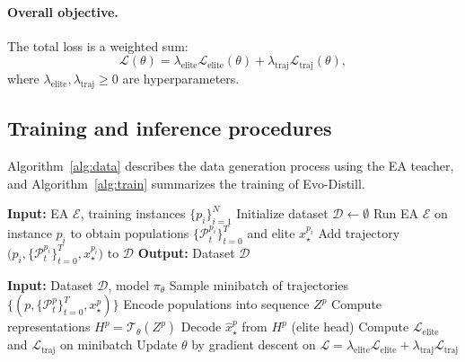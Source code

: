 \documentclass{article}
\begin{document}
\paragraph{Overall objective.}
The total loss is a weighted sum:
\begin{equation}
    \mathcal{L}(\theta) = \lambda_{\text{elite}} \mathcal{L}_{\text{elite}}(\theta) + \lambda_{\text{traj}} \mathcal{L}_{\text{traj}}(\theta),
\end{equation}
where $\lambda_{\text{elite}}, \lambda_{\text{traj}} \ge 0$ are hyperparameters.

\subsection{Training and inference procedures}

Algorithm~\ref{alg:data} describes the data generation process using the EA teacher, and Algorithm~\ref{alg:train} summarizes the training of Evo-Distill.

\begin{algorithm}[t]
\caption{Data generation with EA teacher}
\label{alg:data}
\begin{algorithmic}[1]
\STATE \textbf{Input:} EA $\mathcal{E}$, training instances $\{p_i\}_{i=1}^N$
\STATE Initialize dataset $\mathcal{D} \leftarrow \emptyset$
    \STATE Run EA $\mathcal{E}$ on instance $p_i$ to obtain populations $\{\mathcal{P}_t^{p_i}\}_{t=0}^T$ and elite $x_\star^{p_i}$
    \STATE Add trajectory $\big(p_i, \{\mathcal{P}_t^{p_i}\}_{t=0}^T, x_\star^{p_i}\big)$ to $\mathcal{D}$
\ENDFOR
\STATE \textbf{Output:} Dataset $\mathcal{D}$
\end{algorithmic}
\end{algorithm}

\begin{algorithm}[t]
\caption{Training Evo-Distill}
\label{alg:train}
\begin{algorithmic}[1]
\STATE \textbf{Input:} Dataset $\mathcal{D}$, model $\pi_\theta$
    \STATE Sample minibatch of trajectories $\{(p, \{\mathcal{P}_t^p\}_{t=0}^T, x_\star^p)\}$
    \STATE Encode populations into sequence $Z^p$
    \STATE Compute representations $H^p = \mathcal{T}_\theta(Z^p)$
    \STATE Decode $\hat{x}_\star^p$ from $H^p$ (elite head)
    \STATE Compute $\mathcal{L}_{\text{elite}}$ and $\mathcal{L}_{\text{traj}}$ on minibatch
    \STATE Update $\theta$ by gradient descent on $\mathcal{L} = \lambda_{\text{elite}} \mathcal{L}_{\text{elite}} + \lambda_{\text{traj}} \mathcal{L}_{\text{traj}}$
\ENDWHILE
\end{algorithmic}
\end{algorithm}
\end{document}
